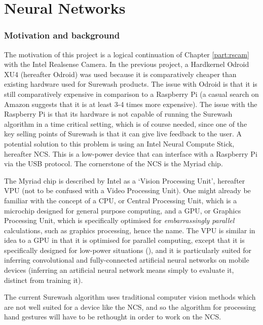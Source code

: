 \part{Neural Networks}
\section{Motivation and background}
The motivation of this project is a logical continuation of Chapter \ref{part:rscam} with the Intel Realsense Camera. In the previous project, a Hardkernel Odroid XU4 (hereafter Odroid) was used because it is comparatively cheaper than existing hardware used for Surewash products. The issue with Odroid is that it is still comparatively expensive in comparison to a Raspberry Pi (a casual search on Amazon suggests that it is at least 3-4 times more expensive). The issue with the Raspberry Pi is that its hardware is not capable of running the Surewash algorithm in a time critical setting, which is of course needed, since one of the key selling points of Surewash is that it can give live feedback to the user. A potential solution to this problem is using an Intel Neural Compute Stick, hereafter NCS. This is a low-power device that can interface with a Raspberry Pi via the USB protocol. The cornerstone of the NCS is the Myriad chip.

The Myriad chip is described by Intel as a `Vision Processing Unit', hereafter VPU (not to be confused with a Video Processing Unit). One might already be familiar with the concept of a CPU, or Central Processing Unit, which is a microchip designed for general purpose computing, and a GPU, or Graphics Processing Unit, which is specifically optimised for {\slshape embarrassingly parallel} calculations, such as graphics processing, hence the name. The VPU is similar in idea to a GPU in that it is optimised for parallel computing, except that it is specifically designed for low-power situations (\cite{7024073}), and it is particularly suited for inferring convolutional and fully-connected artificial neural networks on mobile devices (inferring an artificial neural network means simply to evaluate it, distinct from training it).

The current Surewash algorithm uses traditional computer vision methods which are not well suited for a device like the NCS, and so the algorithm for processing hand gestures will have to be rethought in order to work on the NCS.

